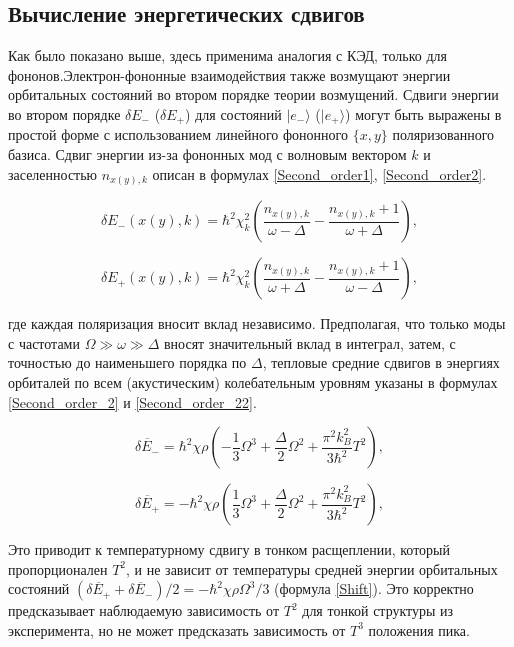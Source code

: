 \subsection{Вычисление энергетических сдвигов}
Как было показано выше, здесь применима аналогия с КЭД, 
только для фононов.Электрон-фононные взаимодействия также возмущают энергии
орбитальных состояний во втором порядке теории возмущений. Сдвиги энергии во втором порядке
$\delta E_{-}$ ($\delta E_{+}$) для состояний $|e_{-}\rangle$ ($|e_{+}\rangle$)
могут быть выражены в простой форме с использованием линейного фононного $\{x, y\}$
поляризованного базиса. Сдвиг энергии из-за фононных мод с волновым вектором
$k$ и заселенностью $n_{x(y), k}$ описан в формулах \ref{Second_order1}, \ref{Second_order2}.

\begin{equation}
    \label{Second_order1}
    \delta E_{-}(x(y), k) = \hbar^2 \chi_k^2 \left( \frac{n_{x(y),k}}{\omega - \Delta}
     - \frac{n_{x(y),k} + 1}{\omega + \Delta} \right), 
\end{equation}

\begin{equation}
    \label{Second_order2}
    \delta E_{+}(x(y), k) = \hbar^2 \chi_k^2 \left( \frac{n_{x(y),k}}{\omega + \Delta}
     - \frac{n_{x(y),k} + 1}{\omega - \Delta} \right),
\end{equation}

где каждая поляризация вносит вклад независимо. Предполагая, что только моды с
частотами $\Omega \gg \omega \gg \Delta$ вносят значительный вклад в интеграл,
затем, с точностью до наименьшего порядка по $\Delta$, тепловые средние
сдвигов в энергиях орбиталей по всем (акустическим) колебательным уровням 
указаны в формулах \ref{Second_order_2} и \ref{Second_order_22}.

\begin{equation}
    \label{Second_order_2}
    \overline{\delta E_{-}} = \hbar^2 \chi \rho \left( -\frac{1}{3}\Omega^3 + 
    \frac{\Delta}{2}\Omega^2 + \frac{\pi^2 k_B^2}{3\hbar^2}T^2 \right), 
\end{equation}

\begin{equation}
    \label{Second_order_22}
    \overline{\delta E_{+}} = -\hbar^2 \chi \rho \left( \frac{1}{3}\Omega^3 +
    \frac{\Delta}{2}\Omega^2 + \frac{\pi^2 k_B^2}{3\hbar^2}T^2 \right),
\end{equation}
    
Это приводит к температурному сдвигу в тонком расщеплении, который
пропорционален $T^2$, и не зависит от температуры средней энергии 
орбитальных состояний
$(\overline{\delta E_{+}} + \overline{\delta E_{-}})/2 = -\hbar^2 \chi \rho
\Omega^3 /3$ (формула \ref{Shift}). Это корректно предсказывает наблюдаемую зависимость от $T^2$
для тонкой структуры из эксперимента, но не может предсказать зависимость
от $T^3$ положения пика.
    
